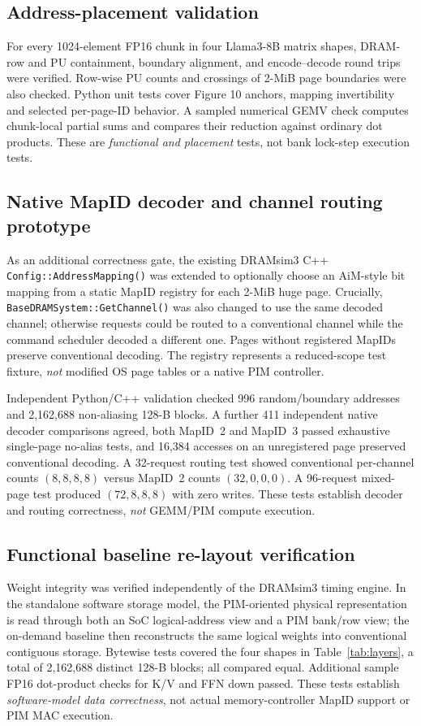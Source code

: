 \documentclass[conference,10pt]{IEEEtran}
\begin{document}
\subsection{Address-placement validation}
For every 1024-element FP16 chunk in four Llama3-8B matrix shapes,
DRAM-row and PU containment, boundary alignment,
and encode--decode round trips were verified. Row-wise
PU counts and crossings of 2-MiB page boundaries were also checked. Python unit
tests cover Figure 10 anchors, mapping invertibility and selected
per-page-ID behavior. A sampled numerical GEMV check computes
chunk-local partial sums and compares their reduction against
ordinary dot products. These are \emph{functional and placement}
tests, not bank lock-step execution tests.

\subsection{Native MapID decoder and channel routing prototype}
As an additional correctness gate, the existing
DRAMsim3 C++ \texttt{Config::AddressMapping()} was extended to optionally choose
an AiM-style bit mapping from a static MapID registry for each
2-MiB huge page. Crucially,
\texttt{BaseDRAMSystem::GetChannel()} was also changed to use the same decoded
channel; otherwise requests could be routed to a conventional
channel while the command scheduler decoded a different one.
Pages without registered MapIDs preserve conventional decoding.
The registry represents a reduced-scope test fixture, \emph{not}
modified OS page tables or a native PIM controller.

Independent Python/C++ validation checked 996 random/boundary
addresses and 2,162,688 non-aliasing 128-B blocks. A further 411
independent native decoder comparisons agreed, both MapID~2 and MapID~3
passed exhaustive single-page no-alias tests, and 16,384 accesses on
an unregistered page preserved conventional decoding. A 32-request routing test
showed conventional per-channel counts $(8,8,8,8)$ versus MapID~2
counts $(32,0,0,0)$. A 96-request mixed-page test produced
$(72,8,8,8)$ with zero writes. These tests establish decoder and
routing correctness, \emph{not} GEMM/PIM compute execution.

\subsection{Functional baseline re-layout verification}
Weight integrity was verified independently of the DRAMsim3 timing
engine. In the standalone software storage model, the PIM-oriented
physical representation is read through both an SoC logical-address
view and a PIM bank/row view; the on-demand baseline then reconstructs
the same logical weights into conventional contiguous storage.
Bytewise tests covered the four shapes in Table~\ref{tab:layers}, a
total of 2,162,688 distinct 128-B blocks; all compared equal.
Additional sample FP16 dot-product checks for K/V and FFN down passed.
These tests establish \emph{software-model data correctness}, not actual
memory-controller MapID support or PIM MAC execution.
\end{document}
